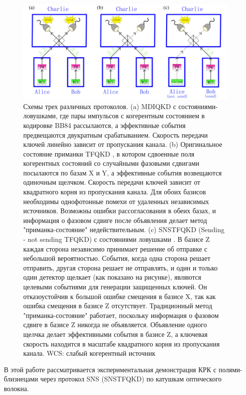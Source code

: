 \begin{figure}
    \centering
    \includegraphics[width=\linewidth]{images/TF schemes lit.jpg}
    \caption{Схемы трех различных протоколов. (a) MDIQKD с состояниями-ловушками, где пары импульсов с когерентным состоянием в кодировке BB84 рассылаются, а эффективные события предвещаются двукратным срабатыванием. Скорость передачи ключей линейно зависит от пропускания канала. (b) Оригинальное состояние приманки TFQKD \cite{lucamarini2018}, в котором сдвоенные поля когерентных состояний со случайными фазовыми сдвигами посылаются по базам X и Y, а эффективные события возвещаются одиночным щелчком. Скорость передачи ключей зависит от квадратного корня из пропускания канала. Для обоих базисов необходимы однофотонные помехи от удаленных независимых источников. Возможны ошибки рассогласования в обеих базах, и информация о фазовом сдвиге после объявления делает метод "приманка-состояние" недействительным. (c) SNSTFQKD (Sending - not sending TFQKD) с состояниями ловушками \cite{ma2005}. В базисе Z каждая сторона независимо принимает решение об отправке с небольшой вероятностью. События, когда одна сторона решает отправить, другая сторона решает не отправлять, и один и только один детектор щелкает (как показано на рисунке), являются целевыми событиями для генерации защищенных ключей. Он отказоустойчив к большой ошибке смещения в базисе X, так как ошибка смещения в базисе Z отсутствует. Традиционный метод "приманка-состояние" работает, поскольку информация о фазовом сдвиге в базисе Z никогда не объявляется. Объявление одного щелчка делает эффективными события в базисе Z, а ключевая скорость находится в масштабе квадратного корня из пропускания канала. WCS: слабый когерентный источник}
    \label{fig:TF protocols scheme}
\end{figure}
В этой работе рассматривается экспериментальная демонстрация КРК с полями-близнецами через протокол SNS (SNSTFQKD) по катушкам оптического волокна.
